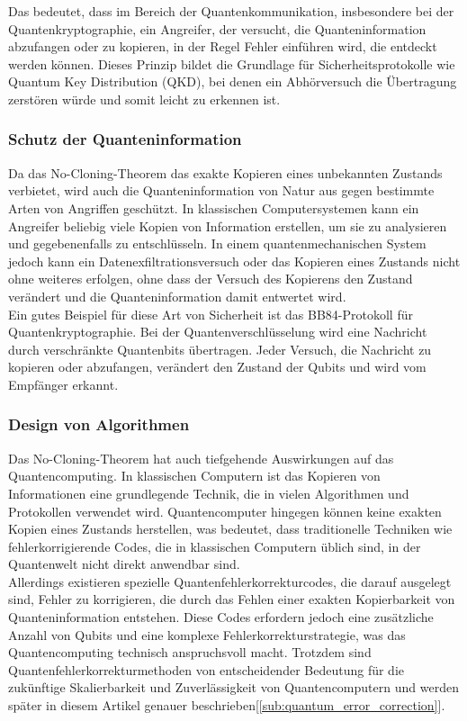 Das bedeutet, dass im Bereich der Quantenkommunikation, insbesondere bei der Quantenkryptographie, ein Angreifer,
der versucht, die Quanteninformation abzufangen oder zu kopieren, in der Regel Fehler einführen wird, die entdeckt werden können.
Dieses Prinzip bildet die Grundlage für Sicherheitsprotokolle wie Quantum Key Distribution (QKD),
bei denen ein Abhörversuch die Übertragung zerstören würde und somit leicht zu erkennen ist.

\subsubsection{Schutz der Quanteninformation}
Da das No-Cloning-Theorem das exakte Kopieren eines unbekannten Zustands verbietet,
wird auch die Quanteninformation von Natur aus gegen bestimmte Arten von Angriffen geschützt.
In klassischen Computersystemen kann ein Angreifer beliebig viele Kopien von Information erstellen,
um sie zu analysieren und gegebenenfalls zu entschlüsseln.
In einem quantenmechanischen System jedoch kann ein Datenexfiltrationsversuch oder das Kopieren eines Zustands
nicht ohne weiteres erfolgen, ohne dass der Versuch des Kopierens den Zustand verändert
und die Quanteninformation damit entwertet wird.\\

Ein gutes Beispiel für diese Art von Sicherheit ist das BB84-Protokoll für Quantenkryptographie.
Bei der Quantenverschlüsselung wird eine Nachricht durch verschränkte Quantenbits übertragen.
Jeder Versuch, die Nachricht zu kopieren oder abzufangen, verändert den Zustand der Qubits und wird vom Empfänger erkannt.

\subsubsection{Design von Algorithmen}

Das No-Cloning-Theorem hat auch tiefgehende Auswirkungen auf das Quantencomputing.
In klassischen Computern ist das Kopieren von Informationen eine grundlegende Technik, die in vielen Algorithmen und Protokollen verwendet wird.
Quantencomputer hingegen können keine exakten Kopien eines Zustands herstellen, was bedeutet,
dass traditionelle Techniken wie fehlerkorrigierende Codes, die in klassischen Computern üblich sind, in der Quantenwelt nicht direkt anwendbar sind.\\

Allerdings existieren spezielle Quantenfehlerkorrekturcodes, die darauf ausgelegt sind, Fehler zu korrigieren,
die durch das Fehlen einer exakten Kopierbarkeit von Quanteninformation entstehen.
Diese Codes erfordern jedoch eine zusätzliche Anzahl von Qubits und eine komplexe Fehlerkorrekturstrategie,
was das Quantencomputing technisch anspruchsvoll macht.
Trotzdem sind Quantenfehlerkorrekturmethoden von entscheidender Bedeutung für die zukünftige Skalierbarkeit
und Zuverlässigkeit von Quantencomputern und werden später in diesem Artikel genauer beschrieben[\ref{sub:quantum_error_correction}].

